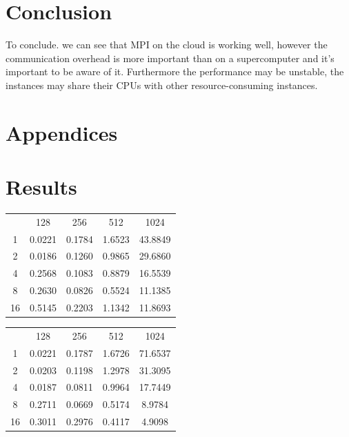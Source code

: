 \documentclass[a4paper,11pt]{article}
\begin{document}
\section*{Conclusion}

To conclude. we can see that MPI on the cloud is working well, however the
communication overhead is more important than on a supercomputer and it's
important to be aware of it. Furthermore the performance may be unstable, the
instances may share their CPUs with other resource-consuming instances.

\section*{Appendices}
\appendix 
\section{Results}
\label{app:rawresults}

\begin{center}
\begin{tabular}{c | c | c | c | c}
   & 128 & 256 & 512 & 1024 \\
1  & 0.0221 & 0.1784 & 1.6523 & 43.8849 \\
2  & 0.0186 & 0.1260 & 0.9865 & 29.6860 \\
4  & 0.2568 & 0.1083 & 0.8879 & 16.5539 \\ 
8  & 0.2630 & 0.0826 & 0.5524 & 11.1385 \\
16 & 0.5145 & 0.2203 & 1.1342 & 11.8693 \\
\end{tabular}
\vspace{1em}
\end{center}

\begin{center}
\begin{tabular}{c | c | c | c | c}
   & 128 & 256 & 512 & 1024 \\
1  & 0.0221 & 0.1787 & 1.6726 & 71.6537 \\
2  & 0.0203 & 0.1198 & 1.2978 & 31.3095 \\
4  & 0.0187 & 0.0811 & 0.9964 & 17.7449 \\
8  & 0.2711 & 0.0669 & 0.5174 & 8.9784 \\
16 & 0.3011 & 0.2976 & 0.4117 & 4.9098
\end{tabular}
\vspace{1em}
\end{center}
\end{document}
